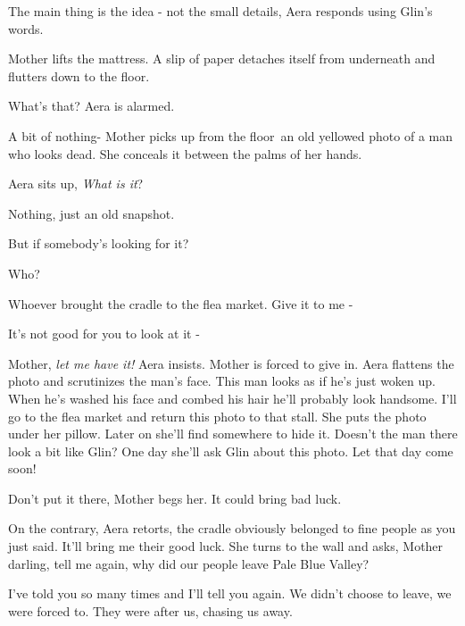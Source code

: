 \documentclass[letterpaper]{article}
\begin{document}
{\textquotedbl}The main thing is the idea - not the small details,{\textquotedbl} Aera responds using Glin's words. 

Mother lifts the mattress. A slip of paper detaches itself from underneath and{ }flutters down to the
floor. 

{\textquotedbl}What's that?{\textquotedbl} Aera is alarmed. 

{\textquotedbl}A bit of nothing-{\textquotedbl} Mother picks up from the floor~an old yellowed photo of a man who looks
dead. She conceals{ }it between the palms of her hands. 

Aera sits up, {\textquotedbl}\textit{What is it}?{\textquotedbl}~ 

{\textquotedbl}Nothing, just an old snapshot.{\textquotedbl} 

{\textquotedbl}But if somebody's looking for it?{\textquotedbl} 

{\textquotedbl}Who?{\textquotedbl} 

{\textquotedbl}Whoever brought the cradle to the flea market. Give it to me -{\textquotedbl} 

{\textquotedbl}It's not good for you to look at it -{\textquotedbl} 

{\textquotedbl}Mother, \textit{let me have it!}{\textquotedbl} Aera insists. Mother is forced to give in. Aera flattens
the photo and scrutinizes the man's face. {\textquotedbl}This man looks as if he's just woken up. When he's washed his
face and combed his hair he'll probably look handsome. I'll go to the flea market and return this photo to that
stall.{\textquotedbl} She puts the photo under her pillow. Later on she'll find somewhere to hide it. Doesn't the man
there look a bit like Glin? One day she'll ask Glin about this photo. Let that day come soon! 

{\textquotedbl}Don't put it there,{\textquotedbl} Mother begs her. {\textquotedbl}It could bring bad
luck.{\textquotedbl} 

{\textquotedbl}On the contrary,{\textquotedbl} Aera retorts, {\textquotedbl}the cradle obviously belonged to fine people
as you just said. It'll bring me their good luck.{\textquotedbl} She turns to the wall and asks, {\textquotedbl}Mother
darling, tell me again, why did our people leave Pale Blue Valley?{\textquotedbl} 

{\textquotedbl}I've told you so many times and I'll tell you again. We didn't choose to leave, we were forced to. They
were after us, chasing us away.{\textquotedbl} 
\end{document}
